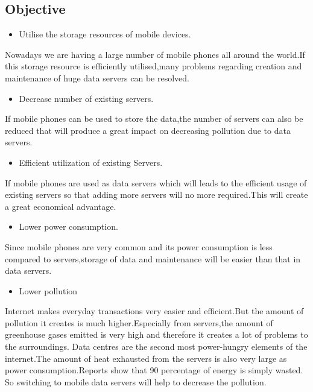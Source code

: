 \documentclass[12pt, a4paper]{article}
\begin{document}
\subsection{Objective}
\begin{itemize}
\item Utilise the storage  resources of mobile devices.
\end{itemize}
\hspace{10mm}Nowadays we are having a large number of mobile phones all around the world.If this storage resource is efficiently utilised,many problems regarding creation and maintenance of huge data servers can be resolved.

\begin{itemize}
\item Decrease number of existing servers.
\end{itemize}
\hspace{10mm}If mobile phones can be used to store the data,the number of servers can also be reduced that will produce a great impact on decreasing pollution due to data servers.

\begin{itemize}
\item Efficient utilization of existing Servers.
\end{itemize}
\hspace{10mm}If mobile phones are used as data servers which will leads to the efficient usage of existing servers so that adding more servers will no more required.This will create a great economical advantage.

\begin{itemize}
\item Lower power consumption.
\end{itemize}
\hspace{10mm}Since mobile phones are very common and its power consumption is less compared to servers,storage of data and maintenance will be easier than that in data servers.

\begin{itemize}
\item Lower pollution 
\end{itemize}
\hspace{10mm}Internet makes everyday transactions very easier and efficient.But the amount of pollution it creates is much higher.Especially from servers,the amount of greenhouse gases emitted is very high and therefore it creates a lot of problems to the surroundings.
Data centres are the second most power-hungry elements of the internet.The amount of heat exhausted from the servers is also very large as power consumption.Reports show that 90 percentage of energy is simply wasted. So switching to mobile data servers will help to decrease the pollution.
\\
\end{document}
